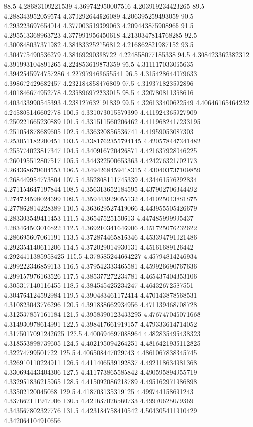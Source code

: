 88.5 4.28683109221539 4.369742950007516 4.203919234423265
89.5 4.288343952059574 4.370292644626089 4.206395259493059
90.5 4.293223697654014 4.377003519399063 4.209443875908965
91.5 4.295513368963723 4.377991956450618 4.2130347814768285
92.5 4.300848037371982 4.384833252756812 4.216862821987152
93.5 4.304775490536279 4.38469290388722 4.224858077185338
94.5 4.308423362382312 4.391993104891265 4.224853619873359
95.5 4.311117033065635 4.3942545974757286 4.227979468655541
96.5 4.315428644079633 4.398672429682457 4.232184858476809
97.5 4.319371823592896 4.401846674952778 4.236896972233015
98.5 4.320780811368616 4.403433990545393 4.238127632191839
99.5 4.326133400622549 4.40646165464232 4.245805146602778
100.5 4.331073015579399 4.411924365927909 4.250221665230889
101.5 4.331511560206462 4.4119682417233195 4.251054878689605
102.5 4.336320856536741 4.41959053087303 4.253051182200451
103.5 4.3381762355794145 4.420578447341482 4.255774023817347
104.5 4.340916720426871 4.421637928046225 4.260195512807517
105.5 4.344322500653363 4.424276321702173 4.264368679604553
106.5 4.3494268459418315 4.430403737109859 4.268449954773804
107.5 4.352808111745339 4.434461576292834 4.271154647197844
108.5 4.356313652184595 4.437902706344492 4.274724598024699
109.5 4.359443929055132 4.441025043881875 4.277862814228389
110.5 4.363629527419066 4.443955505426679 4.283303549411453
111.5 4.36547525150613 4.447485999995437 4.283464503016822
112.5 4.369210341646906 4.451725076232622 4.286695607061191
113.5 4.372874465816346 4.453394791021486 4.292354140611206
114.5 4.372029014930131 4.45161689126442 4.2924411385958425
115.5 4.378585244664227 4.45794814246934 4.299222346859113
116.5 4.379542333465581 4.459926690767636 4.299157976163526
117.5 4.385377272234781 4.465437404353106 4.305317140116455
118.5 4.384545425234247 4.46432672587551 4.304764124592984
119.5 4.390483461172414 4.470143878568531 4.310823043776296
120.5 4.391838662934956 4.471139468708728 4.312537857161184
121.5 4.3958390123433295 4.476747046071668 4.314930978614991
122.5 4.398417661919157 4.479333614714052 4.3175017091242625
123.5 4.400694697088964 4.482835495438323 4.318553898739605
124.5 4.402195094264251 4.4816421935112825 4.32274799501722
125.5 4.406508447029743 4.4861067838345745 4.326910110224911
126.5 4.411406539192837 4.492118634981368 4.330694443404306
127.5 4.411773865585842 4.490595894955719 4.332951836215965
128.5 4.415092086218789 4.495162971986898 4.33502120045068
129.5 4.418703135319125 4.499744158691243 4.337662111947006
130.5 4.421637026560733 4.49970625079369 4.343567802327776
131.5 4.423184758410542 4.504305411910429 4.342064104910656
